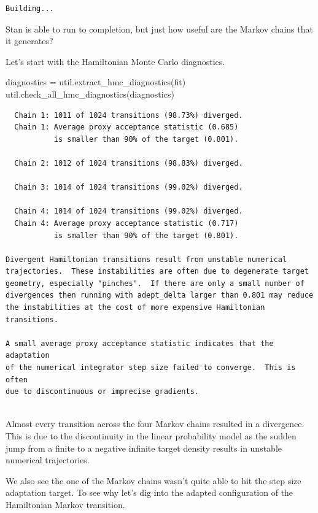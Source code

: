 \documentclass[
  letterpaper,
  DIV=11,
  numbers=noendperiod]{scrartcl}
\newenvironment{Shaded}{\begin{snugshade}}{\end{snugshade}}
\newcommand{\NormalTok}[1]{\textcolor[rgb]{0.00,0.23,0.31}{#1}}
\newcommand{\OperatorTok}[1]{\textcolor[rgb]{0.37,0.37,0.37}{#1}}
\begin{document}
\begin{verbatim}
Building...
\end{verbatim}

Stan is able to run to completion, but just how useful are the Markov
chains that it generates?

Let's start with the Hamiltonian Monte Carlo diagnostics.

\begin{Shaded}
\begin{Highlighting}[]
\NormalTok{diagnostics }\OperatorTok{=}\NormalTok{ util.extract\_hmc\_diagnostics(fit)}
\NormalTok{util.check\_all\_hmc\_diagnostics(diagnostics)}
\end{Highlighting}
\end{Shaded}

\begin{verbatim}
  Chain 1: 1011 of 1024 transitions (98.73%) diverged.
  Chain 1: Average proxy acceptance statistic (0.685)
           is smaller than 90% of the target (0.801).
 
  Chain 2: 1012 of 1024 transitions (98.83%) diverged.
 
  Chain 3: 1014 of 1024 transitions (99.02%) diverged.
 
  Chain 4: 1014 of 1024 transitions (99.02%) diverged.
  Chain 4: Average proxy acceptance statistic (0.717)
           is smaller than 90% of the target (0.801).
 
Divergent Hamiltonian transitions result from unstable numerical
trajectories.  These instabilities are often due to degenerate target
geometry, especially "pinches".  If there are only a small number of
divergences then running with adept_delta larger than 0.801 may reduce
the instabilities at the cost of more expensive Hamiltonian transitions.
 
A small average proxy acceptance statistic indicates that the adaptation
of the numerical integrator step size failed to converge.  This is often
due to discontinuous or imprecise gradients.
 
\end{verbatim}

Almost every transition across the four Markov chains resulted in a
divergence. This is due to the discontinuity in the linear probability
model as the sudden jump from a finite to a negative infinite target
density results in unstable numerical trajectories.

We also see the one of the Markov chains wasn't quite able to hit the
step size adaptation target. To see why let's dig into the adapted
configuration of the Hamiltonian Markov transition.
\end{document}
